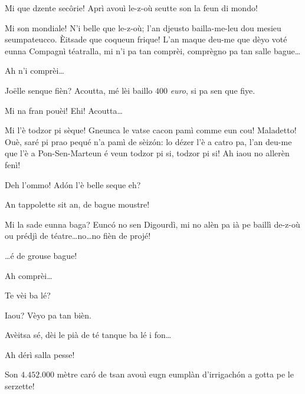 \begin{drama}
\Joellespeaks  Mi que dzente sec\^orie! Aprì avouì le-z-où seutte son la feun di mondo! 

\Pompiolenspeaks Mi son mondiale! N’i belle que le-z-où; l'an djeusto bailla-me-leu dou mesieu seumpateucco. \`Eitsade que coqueun frique!   L'an maque deu-me que dèyo voté eunna Compagnì téatralla, mi n'i pa tan comprèi, comprègno pa tan salle bague\ldots

\Joellespeaks{} Ah n'i comprèi\ldots


\Dallasspeaks Jo\"{e}lle senque fièn? Acoutta, mé lèi baillo $400$ \textit{euro}, si pa sen que fiye.

\Joellespeaks Mi na fran pouèi! Ehi!  Acoutta\ldots

\Pompiolenspeaks Mi l'è todzor pi sèque! Gneunca le vatse cacon pamì com\-me eun cou! Maladetto! Ouè, saré pi prao pequé n'a pamì de sèiz\'on: lo dézer l'è a catro pa, l'an deu-me que l'è a Pon-Sen-Marteun é veun todzor pi si, todzor pi si! Ah iaou no allerèn fenì!


\Dallasspeaks Deh l'ommo! Ad\'on l'è belle seque eh?

\Pompiolenspeaks An tappolette sit an, de bague moustre!

\Dallasspeaks Mi la sade eunna baga? Eunc\'o no sen Digourdì, mi no alèn pa ià pe baillì de-z-où ou prédjì de téatre\ldots no\ldots no fièn de projé!

\Joellespeaks \ldots é de grouse bague!

\Pompiolenspeaks Ah comprèi\ldots

\Dallasspeaks{} Te vèi ba lé?


\Pompiolenspeaks {} Iaou? Vèyo pa tan bièn.

\Dallasspeaks Avèitsa sé, dèi le pià de té tanque ba lé i fon\ldots

\Pompiolenspeaks Ah dérì salla pesse!

\Dallasspeaks Son $4.452.000$ mètre car\'o de tsan avouì eugn eumplàn d'irrigach\'on a gotta pe le serzette!


\end{drama}

